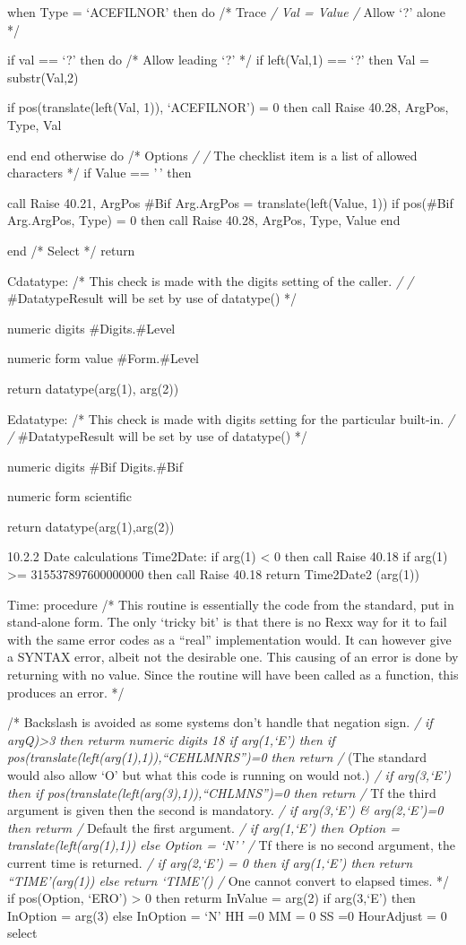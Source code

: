 when Type = `ACEFILNOR' then do /* Trace \emph{/ Val = Value /} Allow
`?' alone */

if val == `?' then do /* Allow leading `?' */ if left(Val,1) == `?' then
Val = substr(Val,2)

if pos(translate(left(Val, 1)), `ACEFILNOR') = 0 then call Raise 40.28,
ArgPos, Type, Val

end end otherwise do /* Options \emph{/ /} The checklist item is a list
of allowed characters */ if Value == '\,' then

call Raise 40.21, ArgPos \#Bif Arg.ArgPos = translate(left(Value, 1)) if
pos(\#Bif Arg.ArgPos, Type) = 0 then call Raise 40.28, ArgPos, Type,
Value end

end /* Select */ return

Cdatatype: /* This check is made with the digits setting of the caller.
\emph{/ /} \#DatatypeResult will be set by use of datatype() */

numeric digits \#Digits.\#Level

numeric form value \#Form.\#Level

return datatype(arg(1), arg(2))

Edatatype: /* This check is made with digits setting for the particular
built-in. \emph{/ /} \#DatatypeResult will be set by use of datatype()
*/

numeric digits \#Bif Digits.\#Bif

numeric form scientific

return datatype(arg(1),arg(2))

10.2.2 Date calculations Time2Date: if arg(1) \textless{} 0 then call
Raise 40.18 if arg(1) \textgreater= 315537897600000000 then call Raise
40.18 return Time2Date2 (arg(1))

Time: procedure /* This routine is essentially the code from the
standard, put in stand-alone form. The only `tricky bit' is that there
is no Rexx way for it to fail with the same error codes as a ``real''
implementation would. It can however give a SYNTAX error, albeit not the
desirable one. This causing of an error is done by returning with no
value. Since the routine will have been called as a function, this
produces an error. */

/* Backslash is avoided as some systems don't handle that negation sign.
\emph{/ if argQ)\textgreater3 then returm numeric digits 18 if
arg(1,`E') then if pos(translate(left(arg(1),1)),``CEHLMNRS'')=0 then
return /} (The standard would also allow `O' but what this code is
running on would not.) \emph{/ if arg(3,`E') then if
pos(translate(left(arg(3),1)),``CHLMNS'')=0 then return /} Tf the third
argument is given then the second is mandatory. \emph{/ if arg(3,`E') \&
arg(2,`E')=0 then returm /} Default the first argument. \emph{/ if
arg(1,`E') then Option = translate(left(arg(1),1)) else Option = `N'\,'
/} Tf there is no second argument, the current time is returned. \emph{/
if arg(2,`E') = 0 then if arg(1,`E') then return ``TIME'(arg(1)) else
return `TIME'() /} One cannot convert to elapsed times. */ if
pos(Option, `ERO') \textgreater{} 0 then returm InValue = arg(2) if
arg(3,`E') then InOption = arg(3) else InOption = `N' HH =0 MM = 0 SS =0
HourAdjust = 0 select

